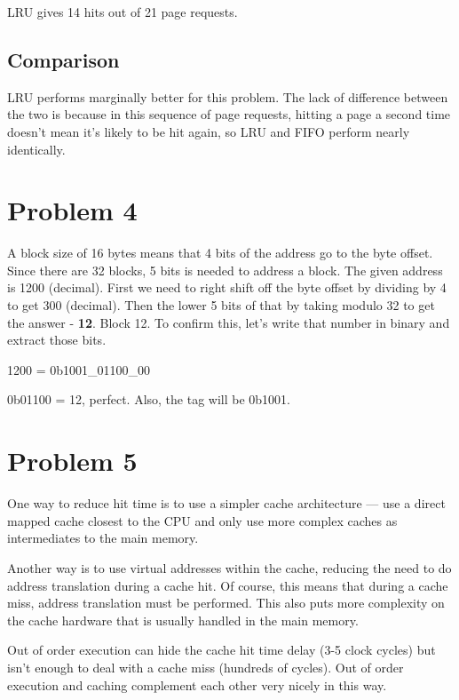 \documentclass[12pt,letterpaper]{article}
\begin{document}
LRU gives 14 hits out of 21 page requests. 

\subsection*{Comparison}

LRU performs marginally better for this problem. The lack of
difference between the two is because in this sequence of page requests, hitting a page a second
time doesn't mean it's likely to be hit again, so LRU and FIFO perform nearly identically. 

\section*{Problem 4}

A block size of 16 bytes means that 4 bits of the address go to the byte offset. Since there are 32
blocks, 5 bits is needed to address a block. The given address is 1200 (decimal). First we need to
right shift off the byte offset by dividing by 4 to get 300 (decimal). Then the lower 5 bits of that
by taking modulo 32 to get the answer - \textbf{12}. Block 12. To confirm this, let's write that number in
binary and extract those bits.

1200 = 0b1001\_01100\_00

0b01100 = 12, perfect. Also, the tag will be 0b1001. 

\section*{Problem 5}

One way to reduce hit time is to use a simpler cache architecture --- use a direct mapped cache
closest to the CPU and only use more complex caches as intermediates to the main memory. 

Another way is to use virtual addresses within the cache, reducing the need to do address
translation during a cache hit. Of course, this means that during a cache miss, address translation
must be performed. This also puts more complexity on the cache hardware that is usually handled in
the main memory.

Out of order execution can hide the cache hit time delay (3-5 clock cycles) but isn't enough to deal
with a cache miss (hundreds of cycles). Out of order execution and caching complement each other very
nicely in this way.
\end{document}
